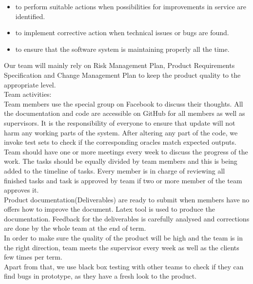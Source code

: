 \documentclass{l3deliverable}
\begin{document}
{\begin{itemize}
\item to perform suitable actions when possibilities for improvements in service are identified.\\
\item to implement corrective action when technical issues or bugs are found.\\
\item to ensure that the software system is maintaining properly all the time.\\
\end{itemize}

Our team will mainly rely on Risk Management Plan, Product Requirements Specification and Change Management Plan to keep the product quality to the appropriate level.\\

Team activities:\\

Team members use the special group on Facebook to discuss their thoughts. All the documentation and code are  accessible on GitHub for all members as well as supervisors. It is the responsibility of everyone to ensure that update will not harm any working parts of the system. After altering any part of the code, we invoke test sets to check if the corresponding oracles match expected outputs.\\ 

Team should have one or more meetings every week to discuss the progress of the work. The tasks should be equally divided by team members and this is being added to the timeline of tasks. Every member is in charge of reviewing all finished tasks and task is approved by team if two or more member of the team approves it. \\

Product documentation(Deliverables) are ready to submit when members have no offers how to improve the document. Latex tool is used to produce the documentation.  Feedback for the deliverables is carefully analysed and corrections are done by the whole team at the end of term.\\

In order to make sure the quality of the product will be high and the team is in the right direction, team meets the supervisor every week as well as the clients few times per term.\\

Apart from that, we use black box testing with other teams to check if they can find bugs in prototype, as they have a fresh look to the product.\\

}
\end{document}
